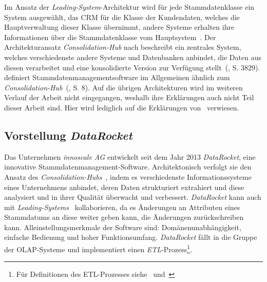\documentclass[
  language=german, %
  type=bachelor,%
  ngerman
]{isthesis}
\begin{document}
\begin{content}
  Im Ansatz der \textit{Leading-System}-Architektur wird für jede
  Stammdatenklasse ein System ausgewählt, \zB{} das \acrshort{CRM} für die
  Klasse der Kundendaten, welches die Hauptverwaltung dieser Klasse übernimmt,
  andere Systeme erhalten ihre Informationen über die Stammdatenklasse vom
  Hauptsystem~\cite[][S. 3829]{baghi2014toward}. Der Architekturansatz
  \textit{Consolidation-Hub} nach \textsc{\citeauthor{baghi2014toward}}
  beschreibt ein zentrales System, welches verschiedenste andere Systeme und
  Datenbanken anbindet, die Daten aus diesen verarbeitet und eine konsolidierte
  Version zur Verfügung stellt~(\citeyear{baghi2014toward}, S. 3829).
  \textsc{\citeauthor{loshin2010master}} definiert Stammdatenmanagementsoftware
  im Allgemeinen ähnlich zum
  \textit{Consolidation-Hub}~(\citeyear{loshin2010master}, S. 8). Auf die
  übrigen Architekturen wird im weiteren Verlauf der Arbeit nicht eingegangen,
  weshalb ihre Erklärungen auch nicht Teil dieser Arbeit sind. Hier wird
  lediglich auf die Erklärungen von~\textsc{\citeauthor{baghi2014toward}}
  \citeyearpar{baghi2014toward} verwiesen.


  \subsection{Vorstellung \textit{DataRocket}}\label{sec:Vorstellung-DataRocket}

	Das Unternehmen \textit{innoscale AG} entwickelt seit dem Jahr 2013
	\textit{DataRocket}, eine innovative Stammdatenmanagement-Software.
	Architektonisch verfolgt sie den Ansatz des
	\textit{Consolidation-Hubs}~\cite[][]{baghi2014toward}, indem es
	verschiedenste Informationssysteme eines Unternehmens anbindet, deren Daten
	strukturiert extrahiert und diese analysiert und in ihrer Qualität überwacht
	und verbessert. \textit{DataRocket} kann auch mit
	\textit{Leading-Systems}~\cite[][]{baghi2014toward} kollaborieren, da es
	Änderungen an Attributen eines Stammdatums an diese weiter geben kann, \bzw{}
	die Änderungen zurückschreiben kann.  Alleinstellungsmerkmale der Software
	sind: Domänenunabhängigkeit, einfache Bedienung und hoher
	Funktionsumfang.
	\textit{DataRocket} fällt in die Gruppe der \acrshort{OLAP}-Systeme und
	implementiert einen \textit{\acrlong{ETL}}-Prozess\footnote{Für Definitionen
	des ETL-Prozesses siehe~\textsc{\citeauthor{vassiliadis2002conceptual}}
	\citeyearpar{vassiliadis2002conceptual}
	und~\textsc{\citeauthor{trujillo2003uml}}}.


\end{content}
\end{document}
